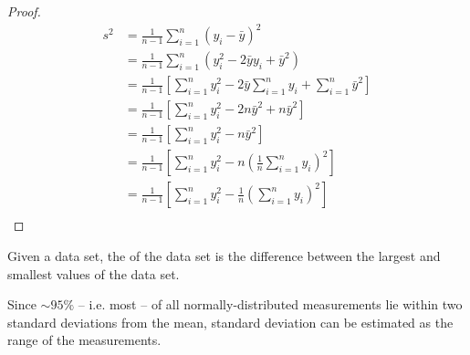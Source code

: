 \begin{proof}
    \begin{align*}
        s^{2} &= \frac{1}{n-1} \sum_{i=1}^{n} (y_{i} - \bar{y})^{2}\\
              &= \frac{1}{n-1} \sum_{i=1}^{n} (y_{i}^{2} -2\bar{y} y_{i} + \bar{y}^{2})\\
              &= \frac{1}{n-1} \left[\sum_{i=1}^{n} y_{i}^{2} -2\bar{y} \sum_{i=1}^{n} y_{i} + \sum_{i=1}^{n} \bar{y}^{2}\right]\\
              &= \frac{1}{n-1} \left[\sum_{i=1}^{n} y_{i}^{2} -2n\bar{y}^{2} + n\bar{y}^{2}\right]\\
              &= \frac{1}{n-1} \left[\sum_{i=1}^{n} y_{i}^{2} -n\bar{y}^{2}\right]\\
              &= \frac{1}{n-1} \left[\sum_{i=1}^{n} y_{i}^{2} -n\left(\frac{1}{n} \sum_{i=1}^{n} y_{i}\right)^{2}\right]\\
              &= \frac{1}{n-1} \left[\sum_{i=1}^{n} y_{i}^{2} -\frac{1}{n}\left(\sum_{i=1}^{n} y_{i}\right)^{2}\right]\\    
    \end{align*}
\end{proof}

\begin{defn}
    Given a data set, the  of the data set is the difference between the largest and smallest values of the data set. 
\end{defn}

\begin{note}
    Since $\sim 95\%$ -- i.e. most -- of all normally-distributed measurements lie within two standard deviations from the mean, standard deviation can be estimated as  the range of the measurements.
\end{note}

